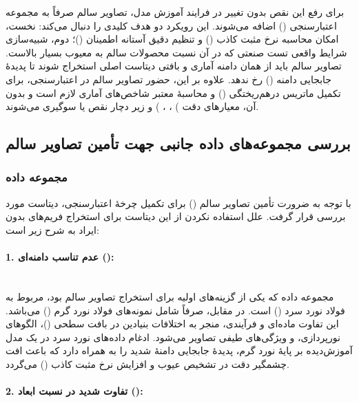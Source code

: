 \documentclass[a4paper, 10pt, twocolumn]{article}
\begin{document}
	برای رفع این نقص بدون تغییر در فرایند آموزش مدل، تصاویر سالم صرفاً به مجموعه اعتبارسنجی () اضافه می‌شوند. این رویکرد دو هدف کلیدی را دنبال می‌کند: نخست، امکان محاسبه نرخ مثبت کاذب () و تنظیم دقیق آستانه اطمینان ()؛ دوم، شبیه‌سازی شرایط واقعی تست صنعتی که در آن نسبت محصولات سالم به معیوب بسیار بالاست. تصاویر سالم باید از همان دامنه آماری و بافتی دیتاست اصلی استخراج شوند تا پدیدهٔ جابجایی دامنه () رخ ندهد. علاوه بر این، حضور تصاویر سالم در اعتبارسنجی، برای تکمیل ماتریس درهم‌ریختگی () و محاسبهٔ معتبر شاخص‌های آماری لازم است و بدون آن، معیارهای دقت ) ، ، ) و  زیر دچار نقص یا سوگیری می‌شوند.
	
	
	
	
	
	\subsection{بررسی مجموعه‌های داده جانبی جهت تأمین تصاویر سالم}
	
	\subsubsection*{مجموعه داده }
	با توجه به ضرورت تأمین تصاویر سالم () برای تکمیل چرخهٔ اعتبارسنجی، دیتاست   مورد بررسی قرار گرفت. علل استفاده نکردن از این دیتاست برای استخراج فریم‌های بدون ایراد به شرح زیر است:
	
	\paragraph{1. عدم تناسب دامنه‌ای (): } \mbox{} \\
	
	مجموعه داده  که یکی از گزینه‌های اولیه برای استخراج تصاویر سالم بود، مربوط به فولاد نورد سرد () است. در مقابل،  صرفاً شامل نمونه‌های فولاد نورد گرم () می‌باشد. این تفاوت ماده‌ای و فرآیندی، منجر به اختلافات بنیادین در بافت سطحی ()، الگوهای نورپردازی، و ویژگی‌های طیفی تصاویر می‌شود. ادغام داده‌های نورد سرد در یک مدل آموزش‌دیده بر پایهٔ نورد گرم، پدیدهٔ جابجایی دامنهٔ شدید را به همراه دارد که باعث افت چشمگیر دقت در تشخیص عیوب و افزایش نرخ مثبت کاذب () می‌گردد.
	
	\paragraph{2. تفاوت شدید در نسبت ابعاد (): } \mbox{} \\
	
\end{document}
